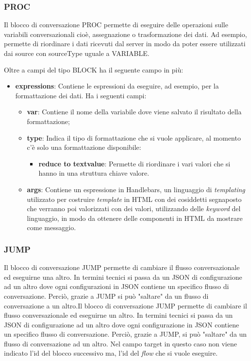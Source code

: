 \subsubsection{PROC}
Il blocco di conversazione PROC permette di eseguire delle operazioni sulle variabili conversazionali cioè, assegnazione o trasformazione dei dati. Ad esempio, permette di riordinare i dati ricevuti dal server in modo da poter essere utilizzati dai source con sourceType uguale a VARIABLE.


Oltre a campi del tipo BLOCK ha il seguente campo in più:

\begin{itemize}
	\item \textbf{expressions}: Contiene le espressioni da eseguire, ad esempio, per la formattazione dei dati.
	Ha i seguenti campi:
	\begin{itemize}
		\item \textbf{var}: Contiene il nome della variabile dove viene salvato il risultato della formattazione;
		\item \textbf{type}: Indica il tipo di formattazione che si vuole applicare, al momento c'è solo una formattazione disponibile:
		\begin{itemize}
			\item \textbf{reduce to textvalue}: Permette di riordinare i vari valori che si hanno in una struttura chiave valore.
		\end{itemize}
		\item \textbf{args}: Contiene un espressione in Handlebars, un linguaggio di \emph{templating} utilizzato per costruire \emph{template} in HTML con dei cosiddetti segnaposto che verranno poi valorizzati con dei valori, utilizzando delle \emph{keyword} del linguaggio, in modo da ottenere delle componenti in HTML da mostrare come messaggio.
	\end{itemize}
\end{itemize}

\subsubsection{JUMP}

Il blocco di conversazione JUMP permette di cambiare il flusso conversazionale ed eseguirne una altro. In termini tecnici si passa da un JSON di configurazione ad un altro dove ogni configurazioni in JSON contiene un specifico flusso di conversazione. Perciò, grazie a JUMP si può "saltare" da un flusso di conversazione a un altro.Il blocco di conversazione JUMP permette di cambiare il flusso conversazionale ed eseguirne un altro. In termini tecnici si passa da un JSON di configurazione ad un altro dove ogni configurazione in JSON contiene un specifico flusso di conversazione. Perciò, grazie a JUMP, si può "saltare" da un flusso di conversazione ad un altro.
Nel campo target in questo caso non viene indicato l’id del blocco successivo ma, l’id del \emph{flow} che si vuole eseguire.


